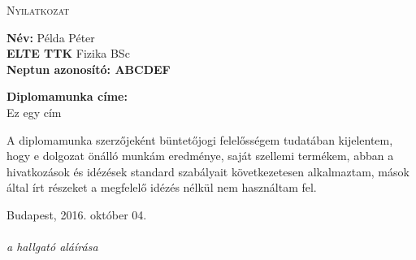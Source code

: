 \newpage
\thispagestyle{empty}
\begin{center}
\Large{ \textsc{Nyilatkozat} }
\end{center}

\vspace*{1cm}
\noindent \textbf{Név:} Példa Péter\\
\textbf{ELTE TTK} Fizika BSc \\
\textbf{Neptun azonosító: ABCDEF} 

\vspace*{0.5cm}
\noindent \textbf{Diplomamunka címe:} \\
Ez egy cím

\vspace*{2.5cm}
A diplomamunka szerzőjeként büntetőjogi felelősségem tudatában kijelentem, hogy e dolgozat önálló munkám eredménye, saját szellemi termékem, abban a hivatkozások és idézések standard szabályait következetesen alkalmaztam, mások által írt részeket a megfelelő idézés nélkül nem használtam fel.

\vspace*{4.5cm}
\noindent Budapest, 2016. október 04. \\
\hspace*{10.0cm}{........................................}\\[2ex]
\hspace*{10cm}\emph{a hallgató aláírása}

